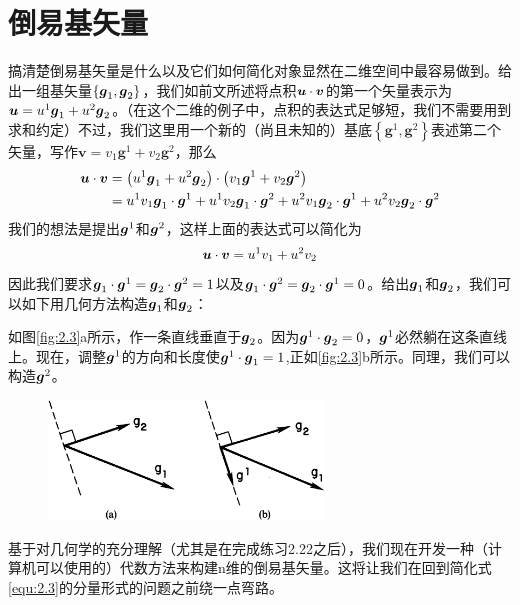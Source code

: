\section{倒易基矢量}
搞清楚倒易基矢量是什么以及它们如何简化对象显然在二维空间中最容易做到。给出一组基矢量$\left\{ \boldsymbol{g}_1,\boldsymbol{g}_2 \right\} $，我们如前文所述将点积$\boldsymbol{u}\cdot \boldsymbol{v}$的第一个矢量表示为$\boldsymbol{u}=u^1\boldsymbol{g}_1+u^2\boldsymbol{g}_2$。（在这个二维的例子中，点积的表达式足够短，我们不需要用到求和约定）不过，我们这里用一个新的（尚且未知的）基底$\left\{ \boldsymbol{g}^1,\boldsymbol{g}^2 \right\} $表述第二个矢量，写作$\boldsymbol{v}=v_1\boldsymbol{g}^1+v_2\boldsymbol{g}^2$，那么
\begin{align*}
	\boldsymbol{u}\cdot \boldsymbol{v}&=\left( u^1\boldsymbol{g}_1+u^2\boldsymbol{g}_2 \right) \cdot \left( v_1\boldsymbol{g}^1+v_2\boldsymbol{g}^2 \right)\\
	&=u^1v_1\boldsymbol{g}_1\cdot \boldsymbol{g}^1+u^1v_2\boldsymbol{g}_1\cdot \boldsymbol{g}^2+u^2v_1\boldsymbol{g}_2\cdot \boldsymbol{g}^1+u^2v_2\boldsymbol{g}_2\cdot \boldsymbol{g}^2
\end{align*}
我们的想法是提出$\boldsymbol{g}^1$和$\boldsymbol{g}^2$，这样上面的表达式可以简化为
\begin{equation*}
    \boldsymbol{u}\cdot \boldsymbol{v}=u^1v_1+u^2v_2
\end{equation*}
因此我们要求$\boldsymbol{g}_1\cdot \boldsymbol{g}^1=\boldsymbol{g}_2\cdot \boldsymbol{g}^2=1$以及$\boldsymbol{g}_1\cdot \boldsymbol{g}^2=\boldsymbol{g}_2\cdot \boldsymbol{g}^1=0$。给出$\boldsymbol{g}_1$和$\boldsymbol{g}_2$，我们可以如下用几何方法构造$\boldsymbol{g}_1$和$\boldsymbol{g}_2$：

如图\eqref{fig:2.3}a所示，作一条直线垂直于$\boldsymbol{g}_2$。因为$\boldsymbol{g}^1\cdot \boldsymbol{g}_2=0$，$\boldsymbol{g}^1$必然躺在这条直线上。现在，调整$\boldsymbol{g}^1$的方向和长度使$\boldsymbol{g}^1\cdot \boldsymbol{g}_1=1$,正如\eqref{fig:2.3}b所示。同理，我们可以构造$\boldsymbol{g}^2$。

\begin{figure}[htbp]
	\centering
	\includegraphics[width=0.65\textwidth]{./image/2.3.png}
	\caption{}
	\label{fig:2.3}
\end{figure}

基于对几何学的充分理解（尤其是在完成练习2.22之后），我们现在开发一种（计算机可以使用的）代数方法来构建n维的倒易基矢量。这将让我们在回到简化式\eqref{equ:2.3}的分量形式的问题之前绕一点弯路。

